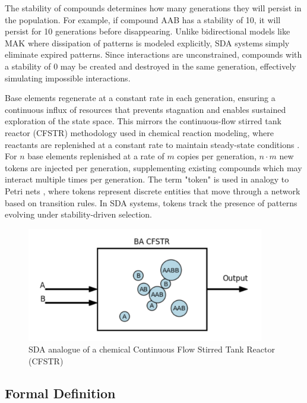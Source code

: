\documentclass[preprint,12pt]{elsarticle}
\begin{document}
The stability of compounds determines how many generations they will persist in the population. For example, if compound AAB has a stability of 10, it will persist for 10 generations before disappearing. Unlike bidirectional models like MAK where dissipation of patterns is modeled explicitly, SDA systems simply eliminate expired patterns. Since interactions are unconstrained, compounds with a stability of 0 may be created and destroyed in the same generation, effectively simulating impossible interactions. 

Base elements regenerate at a constant rate in each generation, ensuring a continuous influx of resources that prevents stagnation and enables sustained exploration of the state space. This mirrors the continuous-flow stirred tank reactor (CFSTR) methodology used in chemical reaction modeling, where reactants are replenished at a constant rate to maintain steady-state conditions \cite{fogler1999chemical}. For \( n \) base elements replenished at a rate of \( m \) copies per generation, \( n \cdot m \) new tokens are injected per generation, supplementing existing compounds which may interact multiple times per generation. The term "token" is used in analogy to Petri nets \cite{petri1962communication}, where tokens represent discrete entities that move through a network based on transition rules. In SDA systems, tokens track the presence of patterns evolving under stability-driven selection.

\begin{figure}[htp]
    \centering
    \includegraphics[height=5cm]{figure_1}
    \caption{SDA analogue of a chemical Continuous Flow Stirred Tank Reactor (CFSTR)}
    \label{fig:figure_1}
\end{figure}

\subsection{Formal Definition}
\end{document}
